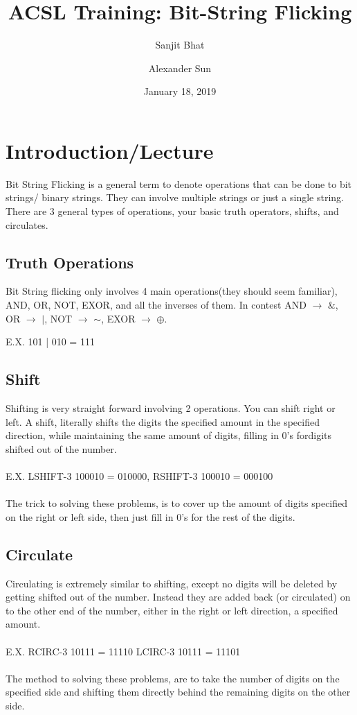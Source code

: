 \documentclass[11pt,letterpaper]{article}
\title{ACSL Training: Bit-String Flicking}
\author{Sanjit Bhat \and Alexander Sun}
\date{January 18, 2019}
\begin{document}
\maketitle

\section{Introduction/Lecture}
Bit String Flicking is a general term to denote operations that can be done to bit strings/ binary strings. They can involve multiple strings or just a single string. There are 3 general types of operations, your basic truth operators, shifts, and circulates.
\subsection{Truth Operations}
Bit String flicking only involves 4 main operations(they should seem familiar), AND, OR, NOT, EXOR, and all the inverses of them. In contest AND $\rightarrow$ $\&$, OR $\rightarrow$ $\mid$, NOT $\rightarrow$ $\sim$,  EXOR $\rightarrow$ $\oplus$.

E.X. 101 | 010 = 111
\subsection{Shift}
Shifting is very straight forward involving 2 operations. You can shift right or left. A shift, literally shifts the digits the specified amount in the specified direction, while maintaining the same amount of digits, filling in 0's fordigits shifted out of the number.
\\
\\
E.X. LSHIFT-3 100010 =  010000, RSHIFT-3 100010 = 000100
\\
\\
The trick to solving these problems, is to cover up the amount of digits specified on the right or left side, then just fill in 0's for the rest of the digits.
\subsection{Circulate}
Circulating is extremely similar to shifting, except no digits will be deleted by getting shifted out of the number. Instead they are added back (or circulated) on to the other end of the number, either in the right or left direction, a specified amount.
\\
\\
E.X. RCIRC-3    10111 = 11110         LCIRC-3   10111 = 11101
\\
\\
The method to solving these problems, are to take the number of digits on the specified side and shifting them directly behind the remaining digits on the other side.
\end{document}
